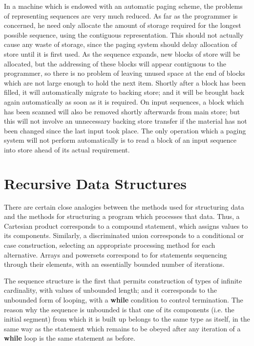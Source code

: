 In a machine which is endowed with an automatic paging scheme, the problems of representing sequences are very much reduced. As far as the programmer is concerned, he need only allocate the amount of storage required for the longest possible sequence, using the contiguous representation. This should not actually cause any waste of storage, since the paging system should delay allocation of store until it is first used. As the sequence expands, new blocks of store will be allocated, but the addressing of these blocks will appear contiguous to the programmer, so there is no problem of leaving unused space at the end of blocks which are not large enough to hold the next item. Shortly after a block has been filled, it will automatically migrate to backing store; and it will be brought back again automatically as soon as it is required. On input sequences, a block which has been scanned will also be removed shortly afterwards from main store; but this will not involve an unnecessary backing store transfer if the material has not been changed since the last input took place. The only operation which a paging system will not perform automatically is to read a block of an input sequence into store ahead of its actual requirement.

\section[Recursive data structures]{Recursive Data Structures}

There are certain close analogies between the methods used for structuring data and the methods for structuring a program which processes that data. Thus, a Cartesian product corresponds to a compound statement, which assigns values to its components. Similarly, a discriminated union corresponds to a conditional or case construction, selecting an appropriate processing method for each alternative. Arrays and powersets correspond to for statements sequencing through their elements, with an essentially bounded number of iterations.

The sequence structure is the first that permits construction of types of infinite cardinality, with values of unbounded length; and it corresponds to the unbounded form of looping, with a \textbf{while} condition to control termination. The reason why the sequence is unbounded is that one of its components (i.e. the initial segment) from which it is built up belongs to the same type as itself, in the same way as the statement which remains to be obeyed after any iteration of a \textbf{while} loop is the same statement as before.

